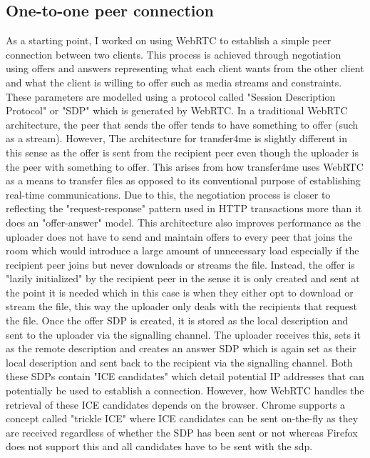 \documentclass[]{report}
\begin{document}
			\subsection{One-to-one peer connection}
			As a starting point, I worked on using WebRTC to establish a simple peer connection between two clients. This process is achieved through negotiation using offers and answers representing what each client wants from the other client and what the client is willing to offer such as media streams and constraints. These parameters are modelled using a protocol called "Session Description Protocol" or "SDP" which is generated by WebRTC. In a traditional WebRTC architecture, the peer that sends the offer tends to have something to offer (such as a stream). However, The architecture for transfer4me is slightly different in this sense as the offer is sent from the recipient peer even though the uploader is the peer with something to offer. This arises from how transfer4me uses WebRTC as a means to transfer files as opposed to its conventional purpose of establishing real-time communications. Due to this, the negotiation process is closer to reflecting the "request-response" pattern used in HTTP transactions more than it does an "offer-answer" model. This architecture also improves performance as the uploader does not have to send and maintain offers to every peer that joins the room which would introduce a large amount of unnecessary load especially if the recipient peer joins but never downloads or streams the file. Instead, the offer is "lazily initialized" by the recipient peer in the sense it is only created and sent at the point it is needed which in this case is when they either opt to download or stream the file, this way the uploader only deals with the recipients that request the file. 
			Once the offer SDP is created, it is stored as the local description and sent to the uploader via the signalling channel. The uploader receives this, sets it as the remote description and creates an answer SDP which is again set as their local description and sent back to the recipient via the signalling channel. Both these SDPs contain "ICE candidates" which detail potential IP addresses that can potentially be used to establish a connection. However, how WebRTC handles the retrieval of these ICE candidates depends on the browser. Chrome supports a concept called "trickle ICE" where ICE candidates can be sent on-the-fly as they are received regardless of whether the SDP has been sent or not whereas Firefox does not support this and all candidates have to be sent with the sdp. 
			
\end{document}
